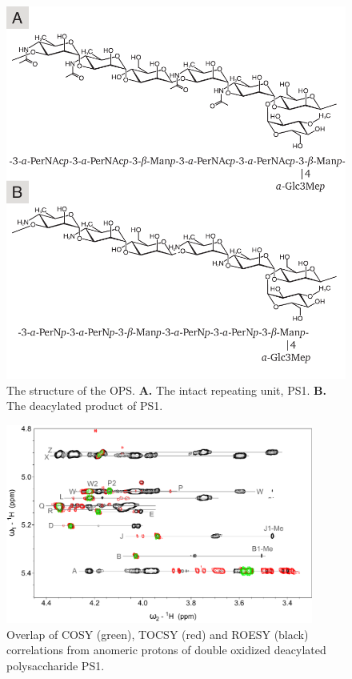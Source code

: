 		\begin{figure}[H]
			\begin{center}
				\includegraphics[]{lps_chapter/img/lpsops.pdf}
			\end{center}
			\caption{The structure of the \caulobacter \ac{OPS}. \textbf{A.} The intact repeating unit, \ac{PS}1. \textbf{B.} The deacylated product of \ac{PS}1.}
			\label{fig:lpsops}
		\end{figure}

		\begin{figure}[H]
			\begin{center}
				\includegraphics[width=0.9\textwidth]{lps_chapter/img/lpsfig3.pdf}
			\end{center}
			\caption{Overlap of \ac{COSY} (green), \ac{TOCSY} (red) and \ac{ROESY} (black) correlations from anomeric protons of double oxidized deacylated \caulobacter polysaccharide \ac{PS}1.}
			\label{fig:lps2dnmr}
		\end{figure}

